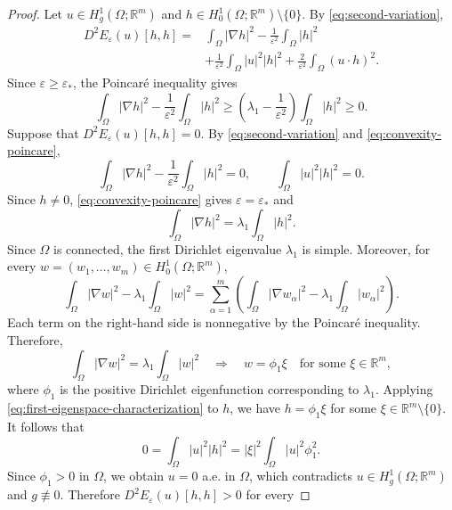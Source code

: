 \documentclass[10pt,a4paper]{amsart}
\newcommand{\R}{\mathbb{R}}
\newcommand{\abs}[1]{\lvert#1\rvert}
\begin{document}
\begin{proof}
	Let $u\in H_g^1(\Omega;\R^m)$ and
	$h\in H_0^1(\Omega;\R^m)\setminus\{0\}$. By
	\eqref{eq:second-variation},
	\[
		\begin{aligned}
		D^2E_\varepsilon(u)[h,h]
		={}&
		\int_\Omega\abs{\nabla h}^2
		-
		\frac{1}{\varepsilon^2}
		\int_\Omega\abs{h}^2\\
		&+
		\frac{1}{\varepsilon^2}
		\int_\Omega\abs{u}^2\abs{h}^2
		+
		\frac{2}{\varepsilon^2}
		\int_\Omega(u\cdot h)^2.
		\end{aligned}
	\]
	Since $\varepsilon\geq\varepsilon_*$, the Poincar\'e inequality gives
	\begin{equation}\label{eq:convexity-poincare}
		\int_\Omega\abs{\nabla h}^2
		-
		\frac{1}{\varepsilon^2}
		\int_\Omega\abs{h}^2
		\geq
		\left(
		\lambda_1-\frac{1}{\varepsilon^2}
		\right)
		\int_\Omega\abs{h}^2
		\geq0.
	\end{equation}
	Suppose that $D^2E_\varepsilon(u)[h,h]=0$. By
	\eqref{eq:second-variation} and \eqref{eq:convexity-poincare},
	\[
		\int_\Omega\abs{\nabla h}^2
		-
		\frac{1}{\varepsilon^2}
		\int_\Omega\abs{h}^2
		=
		0,
		\qquad
		\int_\Omega\abs{u}^2\abs{h}^2
		=
		0.
	\]
	Since $h\neq0$, \eqref{eq:convexity-poincare} gives
	$\varepsilon=\varepsilon_*$ and
	\[
		\int_\Omega\abs{\nabla h}^2
		=
		\lambda_1\int_\Omega\abs{h}^2.
	\]
	Since $\Omega$ is connected, the first Dirichlet eigenvalue
	$\lambda_1$ is simple. Moreover, for every
	$w=(w_1,\ldots,w_m)\in H_0^1(\Omega;\R^m)$,
	\[
		\int_\Omega\abs{\nabla w}^2
		-
		\lambda_1\int_\Omega\abs{w}^2
		=
		\sum_{\alpha=1}^m
		\left(
		\int_\Omega\abs{\nabla w_\alpha}^2
		-
		\lambda_1\int_\Omega\abs{w_\alpha}^2
		\right).
	\]
	Each term on the right-hand side is nonnegative by the Poincar\'e
	inequality. Therefore,
	\begin{equation}\label{eq:first-eigenspace-characterization}
		\int_\Omega\abs{\nabla w}^2
		=
		\lambda_1\int_\Omega\abs{w}^2
		\quad\Longrightarrow\quad
		w=\phi_1\xi
		\quad\text{for some }\xi\in\R^m,
	\end{equation}
	where $\phi_1$ is the positive Dirichlet eigenfunction corresponding
	to $\lambda_1$. Applying
	\eqref{eq:first-eigenspace-characterization} to $h$, we have
	$h=\phi_1\xi$ for some $\xi\in\R^m\setminus\{0\}$. It follows that
	\[
		0
		=
		\int_\Omega\abs{u}^2\abs{h}^2
		=
		\abs{\xi}^2
		\int_\Omega\abs{u}^2\phi_1^2.
	\]
	Since $\phi_1>0$ in $\Omega$, we obtain $u=0$ a.e. in $\Omega$,
	which contradicts $u\in H_g^1(\Omega;\R^m)$ and $g\not\equiv0$.
	Therefore $D^2E_\varepsilon(u)[h,h]>0$ for every

\end{proof}
\end{document}
